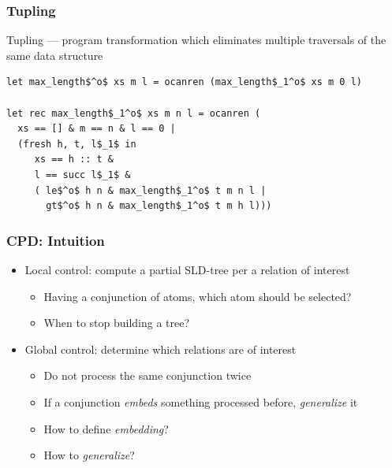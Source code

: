 \documentclass[xcolor=table]{beamer}
\begin{document}
\begin{frame}[fragile]
  \transwipe[direction=90]
  \frametitle{Tupling}
Tupling --- program transformation which eliminates multiple traversals of the same data structure

\begin{lstlisting}[basicstyle=\footnotesize]
let max_length$^o$ xs m l = ocanren (max_length$_1^o$ xs m 0 l)

let rec max_length$_1^o$ xs m n l = ocanren (
  xs == [] & m == n & l == 0 |
  (fresh h, t, l$_1$ in
     xs == h :: t &
     l == succ l$_1$ &
     ( le$^o$ h n & max_length$_1^o$ t m n l |
       gt$^o$ h n & max_length$_1^o$ t m h l)))
\end{lstlisting}


\end{frame}

\begin{frame}[fragile]
  \transwipe[direction=90]
  \frametitle{CPD: Intuition}
\begin{itemize}
  \item Local control: compute a partial SLD-tree per a relation of interest
  \begin{itemize}
    \item Having a conjunction of atoms, which atom should be selected?
    \item When to stop building a tree?
  \end{itemize}
  \item Global control: determine which relations are of interest
  \begin{itemize}
    \item Do not process the same conjunction twice
    \item If a conjunction \textit{embeds} something processed before, \textit{generalize} it
    \item How to define \textit{embedding}?
    \item How to \textit{generalize}?
  \end{itemize}
\end{itemize}
\end{frame}
\end{document}
